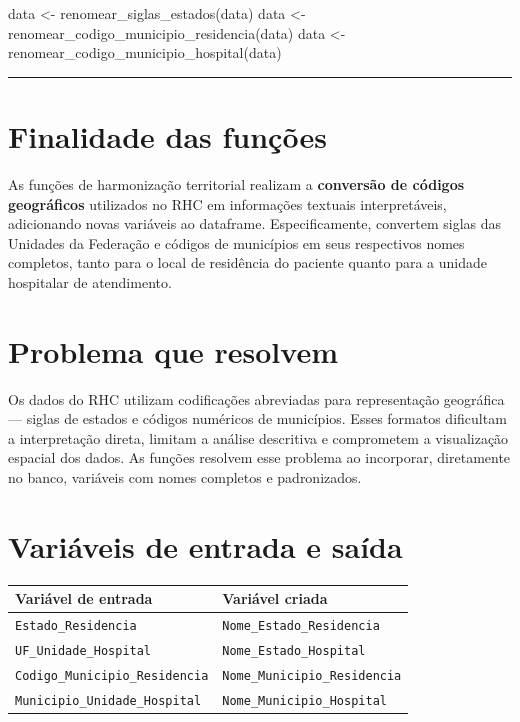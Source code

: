 \documentclass[
  brazilian,
  a4paper,
  oneside]{scrbook}
\newenvironment{Shaded}{\begin{snugshade}}{\end{snugshade}}
\newcommand{\FunctionTok}[1]{\textcolor[rgb]{0.28,0.35,0.67}{#1}}
\newcommand{\NormalTok}[1]{\textcolor[rgb]{0.00,0.23,0.31}{#1}}
\newcommand{\OtherTok}[1]{\textcolor[rgb]{0.00,0.23,0.31}{#1}}
\newcounter{none} %
\begin{document}
\begin{Shaded}
\begin{Highlighting}[]
\NormalTok{data }\OtherTok{\textless{}{-}} \FunctionTok{renomear\_siglas\_estados}\NormalTok{(data)}
\NormalTok{data }\OtherTok{\textless{}{-}} \FunctionTok{renomear\_codigo\_municipio\_residencia}\NormalTok{(data)}
\NormalTok{data }\OtherTok{\textless{}{-}} \FunctionTok{renomear\_codigo\_municipio\_hospital}\NormalTok{(data)}
\end{Highlighting}
\end{Shaded}

\begin{center}\rule{0.5\linewidth}{0.5pt}\end{center}

\section{Finalidade das funções}\label{finalidade-das-funuxe7uxf5es}

As funções de harmonização territorial realizam a \textbf{conversão de
códigos geográficos} utilizados no RHC em informações textuais
interpretáveis, adicionando novas variáveis ao dataframe.
Especificamente, convertem siglas das Unidades da Federação e códigos de
municípios em seus respectivos nomes completos, tanto para o local de
residência do paciente quanto para a unidade hospitalar de atendimento.

\section{Problema que resolvem}\label{problema-que-resolvem}

Os dados do RHC utilizam codificações abreviadas para representação
geográfica --- siglas de estados e códigos numéricos de municípios.
Esses formatos dificultam a interpretação direta, limitam a análise
descritiva e comprometem a visualização espacial dos dados. As funções
resolvem esse problema ao incorporar, diretamente no banco, variáveis
com nomes completos e padronizados.

\section{Variáveis de entrada e
saída}\label{variuxe1veis-de-entrada-e-sauxedda}

{\def\LTcaptype{none} %
\begin{longtable}[]{@{}ll@{}}
\toprule\noalign{}
Variável de entrada & Variável criada \\
\midrule\noalign{}
\endhead
\bottomrule\noalign{}
\endlastfoot
\texttt{Estado\_Residencia} & \texttt{Nome\_Estado\_Residencia} \\
\texttt{UF\_Unidade\_Hospital} & \texttt{Nome\_Estado\_Hospital} \\
\texttt{Codigo\_Municipio\_Residencia} &
\texttt{Nome\_Municipio\_Residencia} \\
\texttt{Municipio\_Unidade\_Hospital} &
\texttt{Nome\_Municipio\_Hospital} \\
\end{longtable}
}
\end{document}
